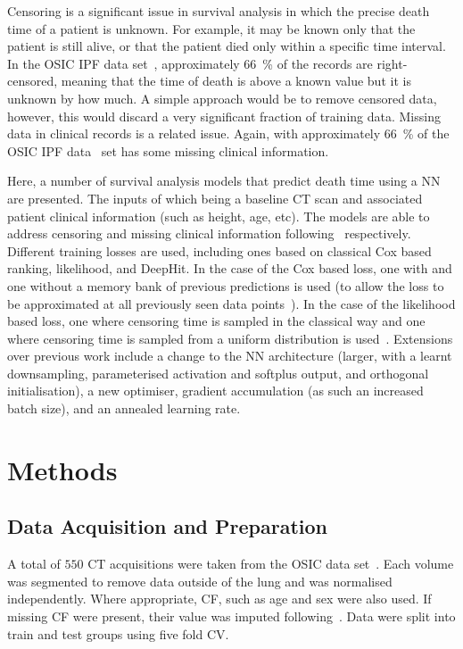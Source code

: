         Censoring is a significant issue in survival analysis in which the precise death time of a patient is unknown. For example, it may be known only that the patient is still alive, or that the patient died only within a specific time interval. In the \gls{OSIC} \gls{IPF} data set~\parencite{OSICOSICRepository}, approximately \SI{66}{\percent} of the records are right-censored, meaning that the time of death is above a known value but it is unknown by how much. A simple approach would be to remove censored data, however, this would discard a very significant fraction of training data. Missing data in clinical records is a related issue. Again, with approximately \SI{66}{\percent} of the \gls{OSIC} \gls{IPF} data~\parencite{OSICOSICRepository} set has some missing clinical information.
    
        Here, a number of survival analysis models that predict death time using a \gls{NN} are presented. The inputs of which being a baseline \gls{CT} scan and associated patient clinical information (such as height, age, etc). The models are able to address censoring and missing clinical information following~\parencite{Shahin2023DeepAnalysis, Shahin2022SurvivalData} respectively. Different training losses are used, including ones based on classical Cox based ranking, likelihood, and DeepHit. In the case of the Cox based loss, one with and one without a memory bank of previous predictions is used (to allow the loss to be approximated at all previously seen data points~\parencite{Shahin2022SurvivalData}). In the case of the likelihood based loss, one where censoring time is sampled in the classical way and one where censoring time is sampled from a uniform distribution is used~\parencite{Shahin2023DeepAnalysis}. Extensions over previous work include a change to the \gls{NN} architecture (larger, with a learnt downsampling, parameterised activation and softplus output, and orthogonal initialisation), a new optimiser, gradient accumulation (as such an increased batch size), and an annealed learning rate.
    
    \section{Methods} \label{sec:deep_learning_for_ct_based_survival_analysis_of_idiopathic_pulmonary_fibrosis_patients_appendix_methods}
        \subsection{Data Acquisition and Preparation} \label{sec:deep_learning_for_ct_based_survival_analysis_of_idiopathic_pulmonary_fibrosis_patients_appendix_data_acquisition_and_preparation}
            A total of $550$ \gls{CT} acquisitions were taken from the \gls{OSIC} data set~\parencite{OSICOSICRepository}. Each volume was segmented to remove data outside of the lung and was normalised independently. Where appropriate, \gls{CF}, such as age and sex were also used. If missing \gls{CF} were present, their value was imputed following~\parencite{Shahin2022SurvivalData}. Data were split into train and test groups using five fold \gls{CV}.


